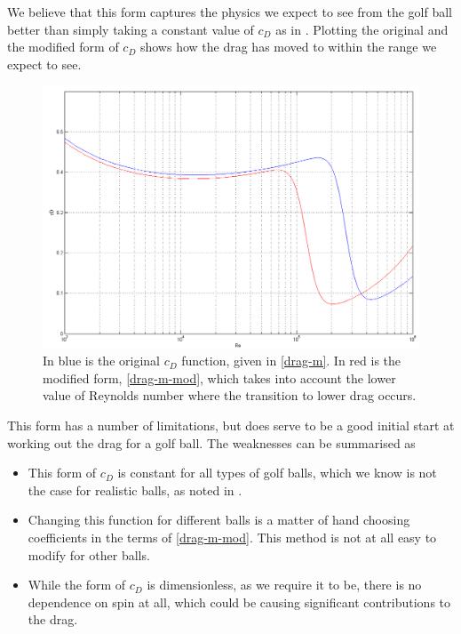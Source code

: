 We believe that this form captures the physics we expect to see from the golf ball better than simply
taking a constant value of $c_D$ as in \citet{Robinson2013}. Plotting the original and the modified
form of $c_D$ shows how the drag has moved to within the range we expect to see.
\begin{figure}
\centering
\includegraphics[scale=0.55]{../images/morrison-modified.png}
\caption[Plotting the original Morrison form against a modified version for golf balls]{In blue is the
original $c_D$ function, given in \eqref{drag-m}. In red is the modified form, \eqref{drag-m-mod}, which
takes into account the lower value of Reynolds number where the transition to lower drag occurs.}
\end{figure}

This form has a number of limitations, but does serve to be a good initial start at working out the 
drag for a golf ball. The weaknesses can be summarised as
\begin{itemize}
\item This form of $c_D$ is constant for all types of golf balls, which we know is not the case for
realistic balls, as noted in \citet{Alam2011}.
\item Changing this function for different balls is a matter of hand choosing coefficients in the terms
of \eqref{drag-m-mod}. This method is not at all easy to modify for other balls.
\item While the form of $c_D$ is dimensionless, as we require it to be, there is no dependence on spin
at all, which could be causing significant contributions to the drag.
\end{itemize}

